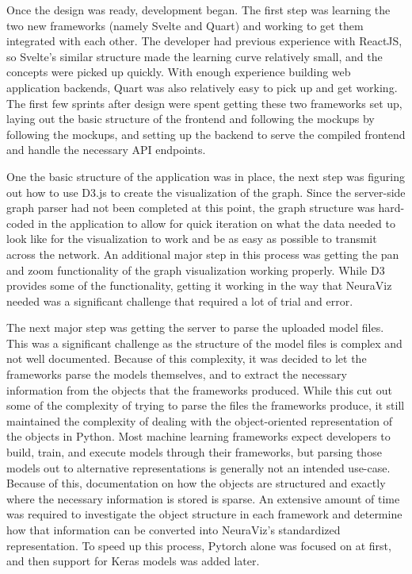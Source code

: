 Once the design was ready, development began. The first step was learning the two new frameworks (namely Svelte and Quart) and working to get them integrated with each other. The developer had previous experience with ReactJS, so Svelte's similar structure made the learning curve relatively small, and the concepts were picked up quickly. With enough experience building web application backends, Quart was also relatively easy to pick up and get working. The first few sprints after design were spent getting these two frameworks set up, laying out the basic structure of the frontend and following the mockups by following the mockups, and setting up the backend to serve the compiled frontend and handle the necessary API endpoints.

One the basic structure of the application was in place, the next step was figuring out how to use D3.js to create the visualization of the graph. Since the server-side graph parser had not been completed at this point, the graph structure was hard-coded in the application to allow for quick iteration on what the data needed to look like for the visualization to work and be as easy as possible to transmit across the network. An additional major step in this process was getting the pan and zoom functionality of the graph visualization working properly. While D3 provides some of the functionality, getting it working in the way that NeuraViz needed was a significant challenge that required a lot of trial and error.

The next major step was getting the server to parse the uploaded model files. This was a significant challenge as the structure of the model files is complex and not well documented. Because of this complexity, it was decided to let the frameworks parse the models themselves, and to extract the necessary information from the objects that the frameworks produced. While this cut out some of the complexity of trying to parse the files the frameworks produce, it still maintained the complexity of dealing with the object-oriented representation of the objects in Python. Most machine learning frameworks expect developers to build, train, and execute models through their frameworks, but parsing those models out to alternative representations is generally not an intended use-case. Because of this, documentation on how the objects are structured and exactly where the necessary information is stored is sparse. An extensive amount of time was required to investigate the object structure in each framework and determine how that information can be converted into NeuraViz's standardized representation. To speed up this process, Pytorch alone was focused on at first, and then support for Keras models was added later.

